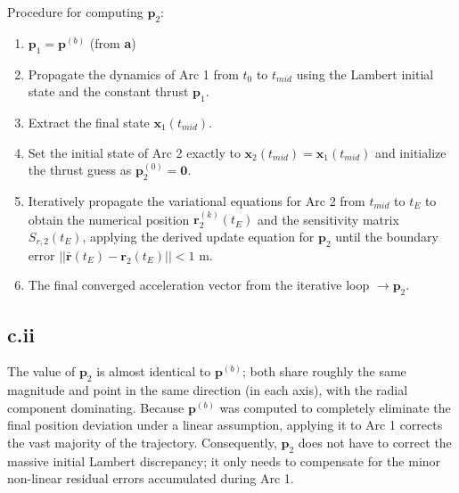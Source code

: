 \documentclass{report}
\begin{document}
Procedure for computing $\mathbf{p}_2$:
\begin{enumerate}
    \item $\mathbf{p}_{1}=\mathbf{p}^{(b)}$ (from \textbf{a})
    \item Propagate the dynamics of Arc 1 from $t_0$ to $t_{mid}$ using the Lambert initial state and the constant thrust $\mathbf{p}_1$. 
    \item Extract the final state $\mathbf{x}_1(t_{mid})$.
    \item Set the initial state of Arc 2 exactly to $\mathbf{x}_2(t_{mid}) = \mathbf{x}_1(t_{mid})$ and initialize the thrust guess as $\mathbf{p}_2^{(0)} = \mathbf{0}$.
    \item Iteratively propagate the variational equations for Arc 2 from $t_{mid}$ to $t_E$ to obtain the numerical position $\mathbf{r}_2^{(k)}(t_E)$ and the sensitivity matrix $S_{r,2}(t_E)$, applying the derived update equation for $\mathbf{p}_2$ until the boundary error $||\bar{\mathbf{r}}(t_E) - \mathbf{r}_2(t_E)|| < 1$ m.
    \item The final converged acceleration vector from the iterative loop $\rightarrow \mathbf{p}_{2}$.
\end{enumerate}

\subsection*{c.ii}


The value of $\mathbf{p}_2$ is almost identical to $\mathbf{p}^{(b)}$; both share roughly the same magnitude and point in the same direction (in each axis), with the radial component dominating. 
Because $\mathbf{p}^{(b)}$ was computed to completely eliminate the final position deviation under a linear assumption, applying it to Arc 1 corrects the vast majority of the trajectory. 
Consequently, $\mathbf{p}_2$ does not have to correct the massive initial Lambert discrepancy; it only needs to compensate for the minor non-linear residual errors accumulated during Arc 1.
\end{document}
